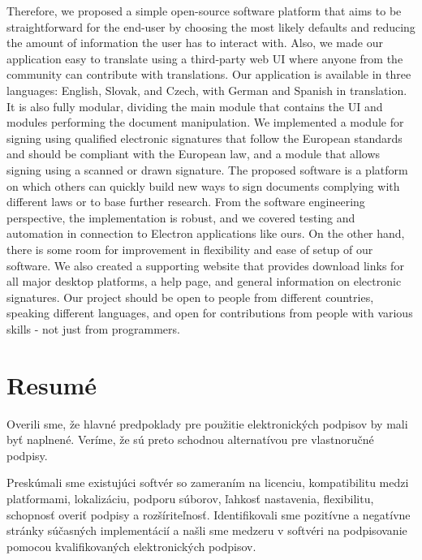\documentclass[thesismargins, english, thesislinespacing, onelinechapterstyle, upjsfrontpage]{rnthesis}
\begin{document}
Therefore, we proposed a simple open-source software platform that aims to be straightforward for the end-user by choosing the most likely defaults and reducing the amount of information the user has to interact with.
Also, we made our application easy to translate using a third-party web UI where anyone from the community can contribute with translations.
Our application is available in three languages: English, Slovak, and Czech, with German and Spanish in translation.
It is also fully modular, dividing the main module that contains the UI and modules performing the document manipulation.
We implemented a module for signing using qualified electronic signatures that follow the European standards and should be compliant with the European law, and a module that allows signing using a scanned or drawn signature.
The proposed software is a platform on which others can quickly build new ways to sign documents complying with different laws or to base further research.
From the software engineering perspective, the implementation is robust, and we covered testing and automation in connection to Electron applications like ours.
On the other hand, there is some room for improvement in flexibility and ease of setup of our software.
We also created a supporting website that provides download links for all major desktop platforms, a help page, and general information on electronic signatures.
Our project should be open to people from different countries, speaking different languages, and open for contributions from people with various skills - not just from programmers.

\chapter*{Resumé}

Overili sme, že hlavné predpoklady pre použitie elektronických podpisov by mali byť naplnené.
Veríme, že sú preto schodnou alternatívou pre vlastnoručné podpisy.

Preskúmali sme existujúci softvér so zameraním na licenciu, kompatibilitu medzi platformami, lokalizáciu, podporu súborov, ľahkosť nastavenia, flexibilitu, schopnosť overiť podpisy a rozšíriteľnosť.
Identifikovali sme pozitívne a negatívne stránky súčasných implementácií a našli sme medzeru v softvéri na podpisovanie pomocou kvalifikovaných elektronických podpisov.
\end{document}
